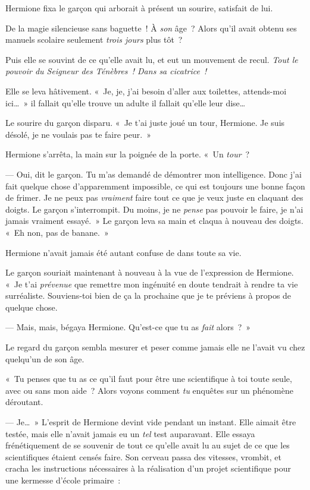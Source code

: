Hermione fixa le garçon qui arborait à présent un sourire, satisfait de lui.

De la magie silencieuse sans baguette~!  À \emph{son} âge~? Alors qu'il avait obtenu ses manuels scolaire seulement \emph{trois jours} plus tôt~?

Puis elle se souvint de ce qu'elle avait lu, et eut un mouvement de recul.
\emph{Tout le pouvoir du Seigneur des Ténèbres~! Dans sa cicatrice~!}

Elle se leva hâtivement. «~Je, je, j'ai besoin d'aller aux toilettes, attends-moi ici…~» il fallait qu'elle trouve un adulte il fallait qu'elle leur dise…

Le sourire du garçon disparu. «~Je t'ai juste joué un tour, Hermione. Je suis désolé, je ne voulais pas te faire peur.~»

Hermione s'arrêta, la main sur la poignée de la porte.  «~Un \emph{tour}~?

--- Oui, dit le garçon.
Tu m'as demandé de démontrer mon intelligence.
Donc j'ai fait quelque chose d'apparemment impossible, ce qui est toujours une bonne façon de frimer.
Je ne peux pas \emph{vraiment} faire tout ce que je veux juste en claquant des doigts.
Le garçon s'interrompit.
Du moins, je ne \emph{pense} pas pouvoir le faire, je n'ai jamais vraiment essayé.~»
Le garçon leva sa main et claqua à nouveau des doigts.
«~Eh non, pas de banane.~»

Hermione n'avait jamais été autant confuse de dans toute sa vie.

Le garçon souriait maintenant à nouveau à la vue de l'expression de Hermione.
«~Je t'ai \emph{prévenue} que remettre mon ingénuité en doute tendrait à rendre ta vie surréaliste. Souviens-toi bien de ça la prochaine que je te préviens à propos de quelque chose.

--- Mais, mais, bégaya Hermione. Qu'est-ce que tu as \emph{fait} alors~?~»

Le regard du garçon sembla mesurer et peser comme jamais elle ne l'avait vu chez quelqu'un de son âge.

«~Tu penses que tu as ce qu'il faut pour être une scientifique à toi toute seule, avec ou sans mon aide~? Alors voyons comment \emph{tu} enquêtes sur un phénomène déroutant.

--- Je…~» L'esprit de Hermione devint vide pendant un instant. Elle aimait être testée, mais elle n'avait jamais eu un \emph{tel} test auparavant. Elle essaya frénétiquement de se souvenir de tout ce qu'elle avait lu au sujet de ce que les scientifiques étaient censés faire. Son cerveau passa des vitesses, vrombit, et cracha les instructions nécessaires à la réalisation d'un projet scientifique pour une kermesse d'école primaire~:

